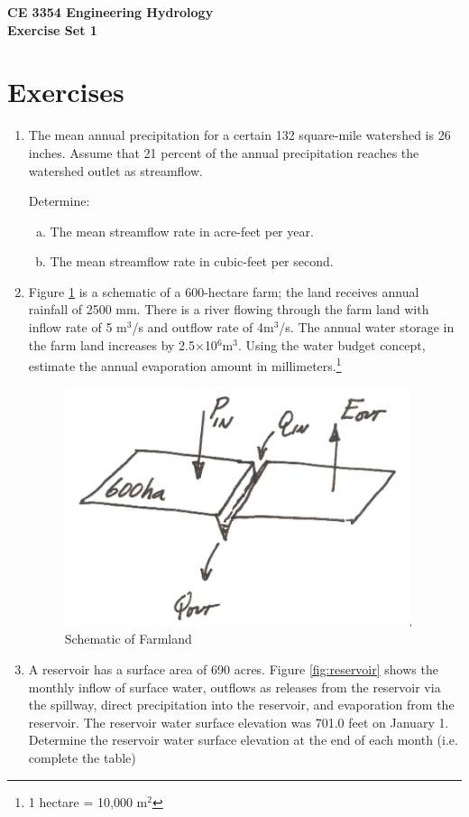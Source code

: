 \documentclass[12pt]{article}
\begin{document}
\begin{center}
{\textbf{{ CE 3354 Engineering Hydrology} \\ {Exercise Set 1}}}
\end{center}

\section*{\small{Exercises}}
\begin{enumerate}
\item The mean annual precipitation for a certain 132 square-mile watershed is 26 inches. Assume that 21 percent of the annual precipitation reaches the watershed outlet as streamflow.

Determine:
    \begin{enumerate}[a)]
        \item The mean streamflow rate in acre-feet per year. 
        \item The mean streamflow rate in cubic-feet per second.
    \end{enumerate}

\clearpage
\item Figure \ref{fig:farmland} is a schematic of a 600-hectare farm; the land receives annual rainfall of 2500 mm.  There is a river flowing through the farm land with inflow rate of 5 m$^3$/s and outflow rate of 4m$^3$/s.  The annual water storage in the farm land increases by 2.5$\times$10$^6$m$^3$.  Using the water budget concept, estimate the annual evaporation amount in millimeters.\footnote{1 hectare = 10,000 m$^2$}

\begin{figure}[h!] %
   \centering
   \includegraphics[width=4in]{farmland.png} 
   \caption{Schematic of Farmland}
   \label{fig:farmland}
\end{figure}
\clearpage
\item A reservoir has a surface area of 690 acres.  Figure \ref{fig:reservoir} shows the monthly inflow of surface water, outflows as releases from the reservoir via the spillway, direct precipitation into the reservoir, and evaporation from the reservoir.  The reservoir water surface elevation was 701.0 feet on January 1.  Determine the reservoir water surface elevation at the end of each month (i.e. complete the table)


\end{enumerate}
\end{document}
